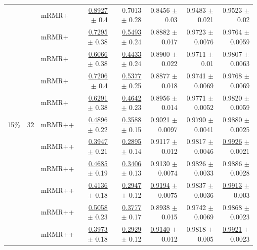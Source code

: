 \begin{longtable}{llp{}rrrrr}
 &  & mRMR+ & \underline{0.8927} {\scriptsize $\pm$ 0.4} & 0.7013 {\scriptsize $\pm$ 0.28} & 0.8456 {\scriptsize $\pm$ 0.03} & 0.9483 {\scriptsize $\pm$ 0.021} & 0.9523 {\scriptsize $\pm$ 0.02} \\
 &  & mRMR+ & \underline{0.7295} {\scriptsize $\pm$ 0.38} & \underline{0.5493} {\scriptsize $\pm$ 0.24} & 0.8882 {\scriptsize $\pm$ 0.017} & 0.9723 {\scriptsize $\pm$ 0.0076} & 0.9764 {\scriptsize $\pm$ 0.0059} \\
 &  & mRMR+ & \underline{0.6066} {\scriptsize $\pm$ 0.38} & \underline{0.4433} {\scriptsize $\pm$ 0.24} & 0.8900 {\scriptsize $\pm$ 0.022} & 0.9711 {\scriptsize $\pm$ 0.01} & 0.9807 {\scriptsize $\pm$ 0.0063} \\
 &  & mRMR+ & \underline{0.7206} {\scriptsize $\pm$ 0.4} & \underline{0.5377} {\scriptsize $\pm$ 0.25} & 0.8877 {\scriptsize $\pm$ 0.018} & 0.9741 {\scriptsize $\pm$ 0.0069} & 0.9768 {\scriptsize $\pm$ 0.0069} \\
 &  & mRMR+ & \underline{0.6291} {\scriptsize $\pm$ 0.38} & \underline{0.4642} {\scriptsize $\pm$ 0.23} & 0.8956 {\scriptsize $\pm$ 0.014} & 0.9771 {\scriptsize $\pm$ 0.0052} & 0.9820 {\scriptsize $\pm$ 0.0059} \\
\midrule
15\% & 32 & mRMR++ & \underline{0.4896} {\scriptsize $\pm$ 0.22} & \underline{0.3588} {\scriptsize $\pm$ 0.15} & 0.9021 {\scriptsize $\pm$ 0.0097} & 0.9790 {\scriptsize $\pm$ 0.0041} & 0.9880 {\scriptsize $\pm$ 0.0025} \\
 &  & mRMR++ & \underline{0.3947} {\scriptsize $\pm$ 0.21} & \underline{0.2895} {\scriptsize $\pm$ 0.14} & 0.9117 {\scriptsize $\pm$ 0.012} & 0.9817 {\scriptsize $\pm$ 0.0046} & \underline{0.9926} {\scriptsize $\pm$ 0.0021} \\
 &  & mRMR++ & \underline{0.4685} {\scriptsize $\pm$ 0.19} & \underline{0.3406} {\scriptsize $\pm$ 0.13} & 0.9130 {\scriptsize $\pm$ 0.0074} & 0.9826 {\scriptsize $\pm$ 0.0033} & 0.9886 {\scriptsize $\pm$ 0.0028} \\
 &  & mRMR++ & \underline{0.4136} {\scriptsize $\pm$ 0.18} & \underline{0.2947} {\scriptsize $\pm$ 0.12} & \underline{0.9194} {\scriptsize $\pm$ 0.0075} & 0.9837 {\scriptsize $\pm$ 0.0036} & \underline{0.9913} {\scriptsize $\pm$ 0.003} \\
 &  & mRMR++ & \underline{0.5058} {\scriptsize $\pm$ 0.23} & \underline{0.3777} {\scriptsize $\pm$ 0.17} & 0.8938 {\scriptsize $\pm$ 0.015} & 0.9742 {\scriptsize $\pm$ 0.0069} & 0.9868 {\scriptsize $\pm$ 0.0023} \\
 &  & mRMR++ & \underline{0.3973} {\scriptsize $\pm$ 0.18} & \underline{0.2929} {\scriptsize $\pm$ 0.12} & \underline{0.9140} {\scriptsize $\pm$ 0.012} & 0.9818 {\scriptsize $\pm$ 0.005} & \underline{0.9921} {\scriptsize $\pm$ 0.0023} \\

\end{longtable}
